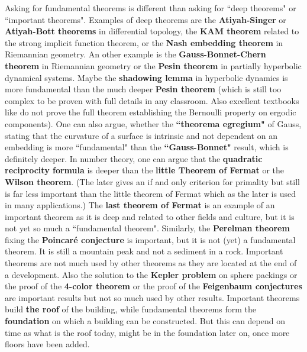 \documentclass[12pt]{amsart}
\newcounter{example}    \def\example#1{ \item \fontsize{12}{15} \selectfont #1 \fontsize{12}{15} \selectfont }
\begin{document}
Asking for fundamental theorems is different than asking for ``deep theorems" or ``important theorems".
Examples of deep theorems are the {\bf Atiyah-Singer} or {\bf Atiyah-Bott theorems} in differential topology,
the {\bf KAM theorem} related to the strong implicit function theorem, or the {\bf Nash embedding theorem} in 
Riemannian geometry. An other example is the {\bf Gauss-Bonnet-Chern theorem} 
in Riemannian geometry or the {\bf Pesin theorem} in partially hyperbolic dynamical systems. 
Maybe the {\bf shadowing lemma} in hyperbolic dynamics is more fundamental than the much deeper 
{\bf Pesin theorem} (which is still too complex to be proven with full details in any classroom.
Also excellent textbooks like \cite{Pollicott1993,KatokStrelcyn} do not prove the full theorem 
establishing the Bernoulli property on ergodic components). 
One can also argue, whether the {\bf ``theorema egregium"} of Gauss, stating that the curvature of a 
surface is intrinsic and not dependent on an embedding is more ``fundamental" than 
the {\bf ``Gauss-Bonnet"} result, which is definitely deeper. 
In number theory, one can argue that the {\bf quadratic reciprocity formula}
is deeper than the {\bf little Theorem of Fermat} or the {\bf Wilson theorem}. (The
later gives an if and only criterion for primality but still is far less important than the little 
theorem of Fermat which as the later is used in many applications.)
The {\bf last theorem of Fermat} \cite{Boston2003} is an example of an important theorem as it is deep and
related to other fields and culture, but it is not yet so much a ``fundamental theorem". 
Similarly, the {\bf Perelman theorem} fixing the {\bf Poincar\'e conjecture} is important, but it is
not (yet) a fundamental theorem. It is still a mountain peak and not a sediment in a rock. 
Important theorems are not much used by other theorems as they are located at the end of a development. 
Also the solution to the {\bf Kepler problem} on sphere packings
or the proof of the {\bf 4-color theorem} \cite{ChartrandZhang2} or the proof of the 
{\bf Feigenbaum conjectures} \cite{DeMelo,Lanford84} are important results
but not so much used by other results. Important theorems build {\bf the roof} of the building, while 
fundamental theorems form the {\bf foundation} on which a building can be constructed. But this
can depend on time as what is the roof today, might be in the foundation later on, once more floors have
been added.  \\
\end{document}

